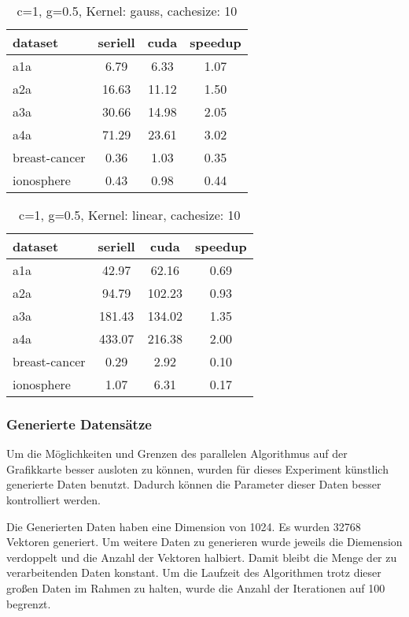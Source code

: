 \documentclass[ngerman]{scrartcl}
\begin{document}
\begin{table}
\begin{center}
\begin{tabular}{|l|c|c|c|}
\hline
dataset & seriell & cuda & speedup \\
\hline
a1a & 6.79 & 6.33 & 1.07 \\
a2a & 16.63 & 11.12 & 1.50 \\
a3a & 30.66 & 14.98 & 2.05 \\
a4a & 71.29 & 23.61 & 3.02 \\
breast-cancer & 0.36 & 1.03 & 0.35 \\
ionosphere & 0.43 & 0.98 & 0.44 \\
\hline
\end{tabular}
\end{center}
\caption{ c=1, g=0.5, Kernel: gauss, cachesize: 10}
\label{tbl:normal-c1-g5-gauss-10}
\end{table}

\begin{table}
\begin{center}
\begin{tabular}{|l|c|c|c|}
\hline
dataset & seriell & cuda & speedup \\
\hline
a1a & 42.97 & 62.16 & 0.69 \\
a2a & 94.79 & 102.23 & 0.93 \\
a3a & 181.43 & 134.02 & 1.35 \\
a4a & 433.07 & 216.38 & 2.00 \\
breast-cancer & 0.29 & 2.92 & 0.10 \\
ionosphere & 1.07 & 6.31 & 0.17 \\
\hline
\end{tabular}
\end{center}
\caption{ c=1, g=0.5, Kernel: linear, cachesize: 10}
\label{tbl:normal-c1-g5-linear-10}
\end{table}


\subsubsection{Generierte Datensätze}
Um die Möglichkeiten und Grenzen des parallelen Algorithmus auf der Grafikkarte besser ausloten zu können, wurden für dieses Experiment künstlich generierte Daten benutzt.
Dadurch können die Parameter dieser Daten besser kontrolliert werden.

Die Generierten Daten haben eine Dimension von 1024. Es wurden 32768 Vektoren generiert. Um weitere Daten zu generieren wurde jeweils die Diemension verdoppelt und die Anzahl der Vektoren halbiert. Damit bleibt die Menge der zu verarbeitenden Daten konstant. Um die Laufzeit des Algorithmen trotz dieser großen Daten im Rahmen zu halten, wurde die Anzahl der Iterationen auf 100 begrenzt.
\end{document}
